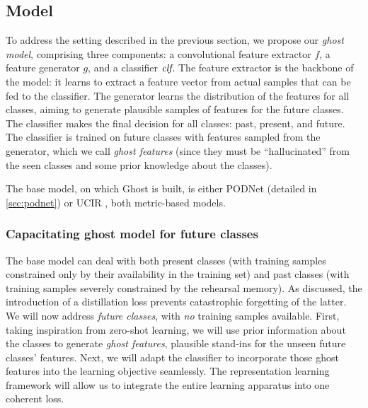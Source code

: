 \subsection{Model}
\label{sec:ghost_model}

To address the setting described in the previous section, we propose our \textit{ghost model},
comprising three components: a convolutional feature extractor $f$, a feature generator $g$, and a
classifier $\textit{clf}$. The feature extractor is the backbone of the model: it learns to extract a
feature vector from actual samples that can be fed to the classifier. The generator learns the
distribution of the features for all classes, aiming to generate plausible samples of features for
the future classes. The classifier makes the final decision for all classes: past, present, and
future. The classifier is trained on future classes with features sampled from the generator, which
we call \textit{ghost features} (since they must be “hallucinated” from the seen classes and some
prior knowledge about the classes).

The base model, on which Ghost is built, is either PODNet (detailed in \autoref{sec:podnet}) or UCIR
\citep{hou2019ucir}, both metric-based models.

\subsubsection{Capacitating ghost model for future classes}
\label{sec:ghost_zeroshot}

The base model can deal with both present classes (with training samples constrained only by their
availability in the training set)  and past classes (with training samples severely constrained by
the rehearsal memory). As discussed, the introduction of a distillation loss prevents catastrophic
forgetting of the latter. We will now address \textit{future classes}, with \textit{no} training
samples available. First, taking inspiration from zero-shot learning, we will use prior information
about the classes to generate \textit{ghost features}, plausible stand-ins for the unseen future
classes' features. Next, we will adapt the classifier to incorporate those ghost features into the
learning objective seamlessly. The representation learning framework will allow us to integrate the
entire learning apparatus into one coherent loss.

